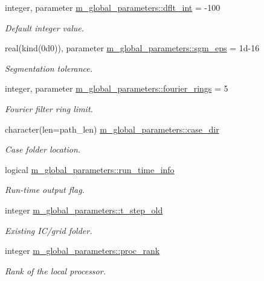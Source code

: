 \begin{DoxyCompactItemize}
integer, parameter \hyperlink{namespacem__global__parameters_a4e4e3806190a62a77cf6542f6d07dbbd}{m\+\_\+global\+\_\+parameters\+::dflt\+\_\+int} = -\/100
\begin{DoxyCompactList}\small\item\em Default integer value. \end{DoxyCompactList}\item 
real(kind(0d0)), parameter \hyperlink{namespacem__global__parameters_aec97838cc58623019b07ae47da7f4c1c}{m\+\_\+global\+\_\+parameters\+::sgm\+\_\+eps} = 1d-\/16
\begin{DoxyCompactList}\small\item\em Segmentation tolerance. \end{DoxyCompactList}\item 
integer, parameter \hyperlink{namespacem__global__parameters_aadeb708160fdfee48fe55e83e41b5064}{m\+\_\+global\+\_\+parameters\+::fourier\+\_\+rings} = 5
\begin{DoxyCompactList}\small\item\em Fourier filter ring limit. \end{DoxyCompactList}\item 
character(len=path\+\_\+len) \hyperlink{namespacem__global__parameters_a0b91e533fe3b3e112c42af4024014544}{m\+\_\+global\+\_\+parameters\+::case\+\_\+dir}
\begin{DoxyCompactList}\small\item\em Case folder location. \end{DoxyCompactList}\item 
logical \hyperlink{namespacem__global__parameters_a63e30bca2565699c008b6b0442ef5494}{m\+\_\+global\+\_\+parameters\+::run\+\_\+time\+\_\+info}
\begin{DoxyCompactList}\small\item\em Run-\/time output flag. \end{DoxyCompactList}\item 
integer \hyperlink{namespacem__global__parameters_a5d0554c4fef91acf46f683e8bcd29133}{m\+\_\+global\+\_\+parameters\+::t\+\_\+step\+\_\+old}
\begin{DoxyCompactList}\small\item\em Existing I\+C/grid folder. \end{DoxyCompactList}\item 
integer \hyperlink{namespacem__global__parameters_a383c6ff025d4ea09ddd4e2356042d86b}{m\+\_\+global\+\_\+parameters\+::proc\+\_\+rank}
\begin{DoxyCompactList}\small\item\em Rank of the local processor. \end{DoxyCompactList}\item 

\end{DoxyCompactItemize}
